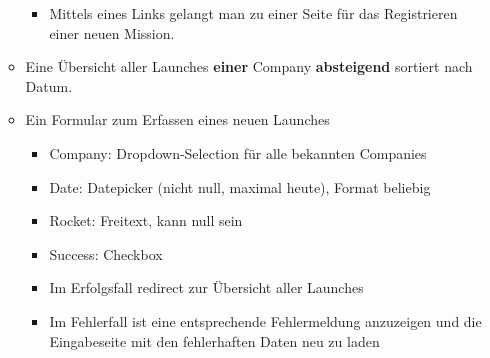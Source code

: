 \begin{itemize}
\begin{itemize}
\begin{itemize}
			\item Mittels eines Links gelangt man zu einer Seite für das Registrieren einer neuen Mission.
		\end{itemize}
		\item Eine Übersicht aller Launches \textbf{einer} Company \textbf{absteigend} sortiert nach Datum.\textbf{}
		\item Ein Formular zum Erfassen eines neuen Launches
		\begin{itemize}
			\item Company: Dropdown-Selection für alle bekannten Companies
			\item Date: Datepicker (nicht null, maximal heute), Format beliebig
			\item Rocket: Freitext, kann null sein
			\item Success: Checkbox
			\item Im Erfolgsfall redirect zur Übersicht aller Launches
			\item Im Fehlerfall ist eine entsprechende Fehlermeldung anzuzeigen und die Eingabeseite mit den fehlerhaften Daten neu zu laden

\end{itemize}
\end{itemize}
\end{itemize}
